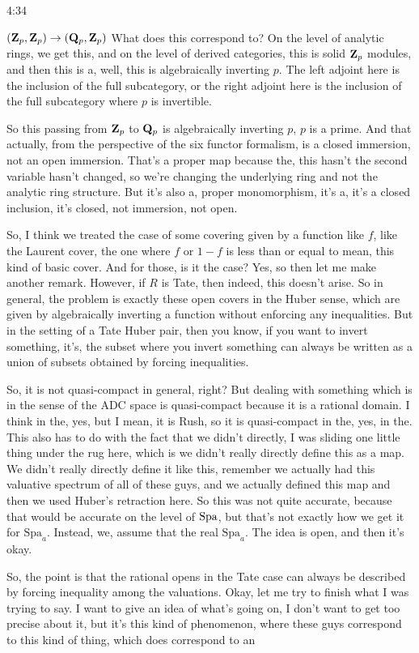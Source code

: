 \begin{unfinished}{4:34}
\begin{example}
$ (\mathbf Z_p, \mathbf Z_p) \rightarrow (\mathbf Q_p, \mathbf Z_p)$
What does this correspond to? On the level of analytic rings, we get this, and on the level of derived categories, this is solid $\mathbf Z_p$ modules, and then this is a, well, this is algebraically inverting $p$. The left adjoint here is the inclusion of the full subcategory, or the right adjoint here is the inclusion of the full subcategory where $p$ is invertible.

So this passing from $\mathbf Z_p$ to $\mathbf Q_p$ is algebraically inverting $p$, $p$ is a prime. And that actually, from the perspective of the six functor formalism, is a closed immersion, not an open immersion. That's a proper map because the, this hasn't the second variable hasn't changed, so we're changing the underlying ring and not the analytic ring structure. But it's also a, proper monomorphism, it's a, it's a closed inclusion, it's closed, not immersion, not open.

So, I think we treated the case of some covering given by a function like $f$, like the Laurent cover, the one where $f$ or $1-f$ is less than or equal to mean, this kind of basic cover. And for those, is it the case? Yes, so then let me make another remark. However, if $R$ is Tate, then indeed, this doesn't arise. So in general, the problem is exactly these open covers in the Huber sense, which are given by algebraically inverting a function without enforcing any inequalities. But in the setting of a Tate Huber pair, then you know, if you want to invert something, it's, the subset where you invert something can always be written as a union of subsets obtained by forcing inequalities.

So, it is not quasi-compact in general, right? But dealing with something which is in the sense of the ADC space is quasi-compact because it is a rational domain. I think in the, yes, but I mean, it is Rush, so it is quasi-compact in the, yes, in the. This also has to do with the fact that we didn't directly, I was sliding one little thing under the rug here, which is we didn't really directly define this as a map. We didn't really directly define it like this, remember we actually had this valuative spectrum of all of these guys, and we actually defined this map and then we used Huber's retraction here. So this was not quite accurate, because that would be accurate on the level of $\operatorname{Spa}$, but that's not exactly how we get it for $\mathrm{Spa}_a$. Instead, we, assume that the real $\mathrm{Spa}_a$. The idea is open, and then it's okay.

So, the point is that the rational opens in the Tate case can always be described by forcing inequality among the valuations. Okay, let me try to finish what I was trying to say. I want to give an idea of what's going on, I don't want to get too precise about it, but it's this kind of phenomenon, where these guys correspond to this kind of thing, which does correspond to an


\end{example}
\end{unfinished}
